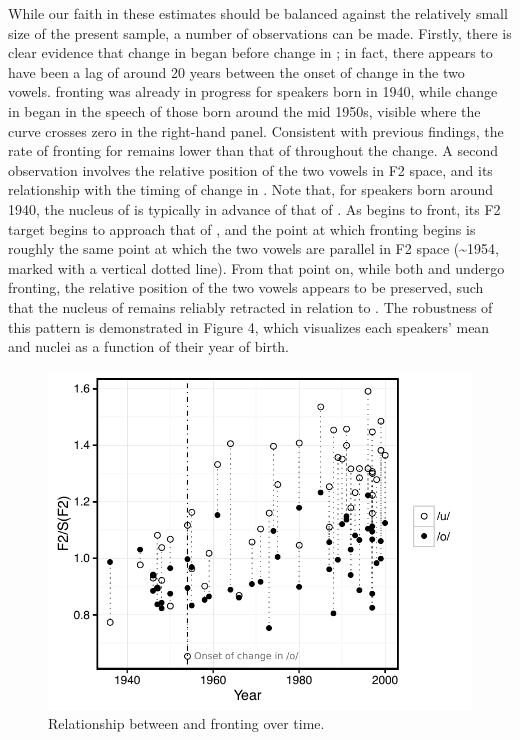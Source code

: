 \documentclass[12pt]{article}
\begin{document}
While our faith in these estimates should be balanced against the relatively small size of the present sample, a number of observations can be made. Firstly, there is clear evidence that change in  began before change in ; in fact, there appears to have been a lag of around 20 years between the onset of change in the two vowels.  fronting was already in progress for speakers born in 1940, while change in  began in the speech of those born around the mid 1950s, visible where the  curve crosses zero in the right-hand panel. Consistent with previous findings, the rate of fronting for  remains lower than that of  throughout the change. A second observation involves the relative position of the two vowels in F2 space, and its relationship with the timing of change in . Note that, for speakers born around 1940, the nucleus of  is typically in advance of that of . As  begins to front, its F2 target begins to approach that of , and the point at which  fronting begins is roughly the same point at which the two vowels are parallel in F2 space (\textasciitilde1954, marked with a vertical dotted line). From that point on, while both  and  undergo fronting, the relative position of the two vowels appears to be preserved, such that the nucleus of  remains reliably retracted in relation to . The robustness of this pattern is demonstrated in Figure 4, which visualizes each speakers' mean  and   nuclei as a function of their year of birth.

\vspace*{6pt}
\begin{figure}[H]
\centering
\includegraphics[scale=.9]{resistance1text.pdf}
\caption{Relationship between  and  fronting over time.}
\end{figure}
\vspace*{6pt}
\end{document}
